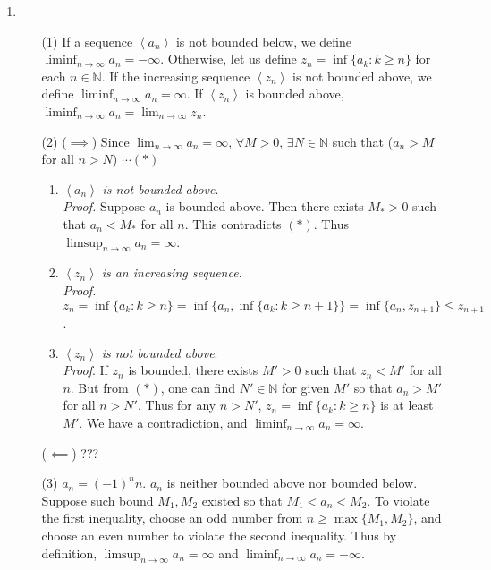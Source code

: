 \documentclass[12pt]{report}
\newcommand{\numl}[1]{\item[\large\textbf{\sffamily #1.}]}
\newcommand{\bb}[1]{\mathbb{#1}}
\renewcommand{\span}[1]{\left\langle #1 \right\rangle}
\newcommand{\ds}{\displaystyle}
\begin{document}
\begin{enumerate}
\numl{3}
\begin{enumerate}
	\item[(1)] If a sequence $\span{a_n}$ is not bounded below, we define $\ds \liminf_{n\rightarrow \infty} a_n = -\infty$. Otherwise, let us define $z_n = \inf\{a_k: k \geq n\}$ for each $n\in\bb{N}$. If the increasing sequence $\span{z_n}$ is not bounded above, we define $\ds \liminf_{n\rightarrow \infty} a_n = \infty$. If $\span{z_n}$ is bounded above, $\ds \liminf_{n\rightarrow \infty} a_n = \lim_{n\rightarrow \infty} z_n$.
	\item[(2)] ($\implies$) Since $\ds \lim_{n\rightarrow \infty}a_n \!=\! \infty$, $\forall M \!>\! 0$, $\exists N\in\bb{N}$ such that ($a_n > M$ for all $n > N$) $\cdots (*)$
	\begin{enumerate}
		\item $\span{a_n}$ \textit{is not bounded above}.\\
		\textit{Proof.} Suppose $a_n$ is bounded above. Then there exists $M_* > 0$ such that $a_n < M_*$ for all $n$. This contradicts $(*)$. Thus $\ds \limsup_{n\rightarrow \infty}a_n = \infty$.
		\item $\span{z_n}$ \textit{is an increasing sequence}.\\
		\textit{Proof.} $z_n \!= \inf\{a_k: k \geq n \}\! = \inf\{a_n, \inf\{a_k: k \geq n + 1 \} \}\! = \inf\{a_n, z_{n+1} \}\leq z_{n+1}$.
		\item $\span{z_n}$ \textit{is not bounded above}.\\
		\textit{Proof}. If $z_n$ is bounded, there exists $M' >0$ such that $z_n < M'$ for all $n$. But from $(*)$, one can find $N'\in \bb{N}$ for given $M'$ so that $a_n > M'$ for all $n > N'$. Thus for any $n>N'$, $z_n = \inf\{a_k: k \geq n \}$ is at least $M'$. We have a contradiction, and $\ds\liminf_{n\rightarrow \infty} a_n = \infty$.
	\end{enumerate}
	($\impliedby$) ???
	\item[(3)] $a_n = (-1)^nn$. $a_n$ is neither bounded above nor bounded below. Suppose such bound $M_1, M_2$ existed so that $M_1 < a_n < M_2$. To violate the first inequality, choose an odd number from $n \geq \max\{M_1, M_2 \}$, and choose an even number to violate the second inequality. Thus by definition, $\ds \limsup_{n\rightarrow \infty}a_n = \infty$ and $\ds \liminf_{n\rightarrow \infty}a_n = -\infty$.
\end{enumerate}


\end{enumerate}
\end{document}
